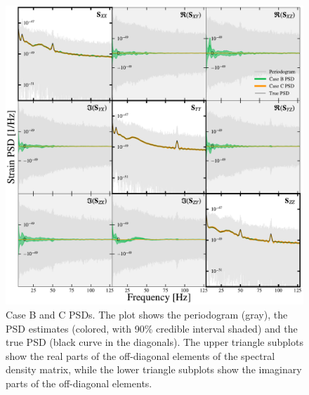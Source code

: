 \documentclass[%
 reprint,
 amsmath,amssymb,
 aps,
 nofootinbib,
]{revtex4-2}
\begin{document}
\begin{figure}
\centering
\includegraphics[width=\textwidth]{caseBC_psd.pdf}
\caption{Case B and C PSDs. The plot shows the periodogram (gray), the PSD estimates (colored, with 90\% credible interval shaded) and the true PSD (black curve in the diagonals). The upper triangle subplots show the real parts of the off-diagonal elements of the spectral density matrix, while the lower triangle subplots show the imaginary parts of the off-diagonal elements.}
\label{fig:caseBC_psd}
\end{figure}


\end{document}
